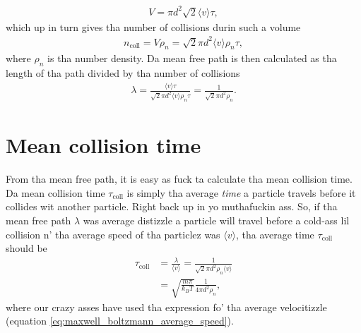 \begin{align}
	V = \pi d^2\sqrt 2\langle v\rangle \tau,
\end{align}
which up in turn gives tha number of collisions durin such a volume
\begin{align}
	\label{eq:num_collisions}
	n_\text{coll} = V\rho_n = \sqrt 2 \pi d^2\langle v\rangle \rho_n \tau,
\end{align}
where $\rho_n$ is tha number density. Da mean free path is then calculated as tha length of tha path divided by tha number of collisions
\begin{align}
	\label{eq:mean_free_path}
	\lambda = \frac{\langle v\rangle \tau}{ \sqrt 2 \pi d^2\langle v\rangle \rho_n\tau} = \frac{1 }{ \sqrt 2 \pi d^2 \rho_n}.
\end{align}
\section{Mean collision time}
From tha mean free path, it is easy as fuck  ta calculate tha mean collision time. Da mean collision time $\tau_\text{coll}$ is simply tha average \textit{time} a particle travels before it collides wit another particle. Right back up in yo muthafuckin ass. So, if tha mean free path $\lambda$ was average distizzle a particle will travel before a cold-ass lil collision n' tha average speed of tha particlez was $\langle v \rangle$, tha average time $\tau_\text{coll}$ should be
\begin{align}
	\label{eq:kinetic_theory_mean_collision_time}
	\tau_\text{coll} &= \frac{\lambda}{\langle v\rangle} = \frac{1}{\sqrt 2 \pi d^2 \rho_n \langle v \rangle}\\
	&= \sqrt{\frac{m\pi}{k_B T}}\frac{1}{4\pi d^2\rho_n},
\end{align}
where our crazy asses have used tha expression fo' tha average velocitizzle (equation \eqref{eq:maxwell_boltzmann_average_speed}). 